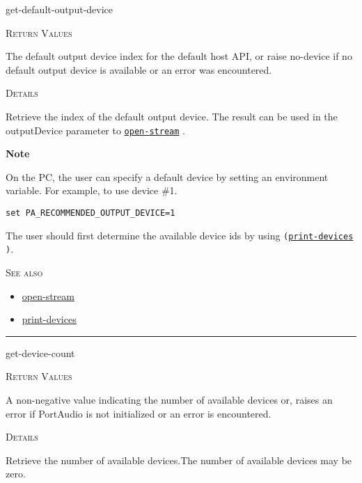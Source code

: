 \documentclass[a4paper]{report}
\begin{document}
    \label{portaudio__fun__get-default-output-device}
    \begin{defun}[Function]
    get-default-output-device


    
    \bigskip
    \textsc{Return Values}


The default output device index for the default host API, or raise no-device if no default output device is available or an error was encountered.


	
    \bigskip
    \textsc{Details}

Retrieve the index of the default output device. The result can be used in the outputDevice parameter to \hyperref[portaudio__fun__open-stream]{\texttt{open-stream}}
  .

\textbf{Note}


On the PC, the user can specify a default device by setting an environment variable. For example, to use device \#1.

\begin{verbatim}set PA_RECOMMENDED_OUTPUT_DEVICE=1\end{verbatim}

The user should first determine the available device ids by using \texttt{(\hyperref[portaudio__fun__print-devices]{\texttt{print-devices}}
  )}. 




      
    \bigskip
    \textsc{See also}


	
    \begin{itemize}
    
	  
    \item
    \hyperref[portaudio__fun__open-stream]{open-stream}
    
    \item
    \hyperref[portaudio__fun__print-devices]{print-devices}
    
	
    \end{itemize}
  
      


    
    \end{defun}
  
  

    \rule{\linewidth}{0.1mm}
    
    \label{portaudio__fun__get-device-count}
    \begin{defun}[Function]
    get-device-count


    
    \bigskip
    \textsc{Return Values}


A non-negative value indicating the number of available devices or, raises an error if PortAudio is not initialized or an error is encountered. 


	
    \bigskip
    \textsc{Details}

Retrieve the number of available devices.The number of available devices may be zero.


    
    \end{defun}
  
\end{document}
